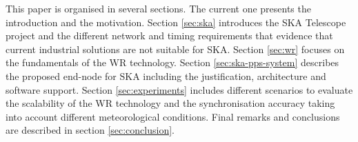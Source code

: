 This paper is organised in several sections. The current one presents the introduction and the motivation. Section \ref{sec:ska} introduces the SKA Telescope project and the different network and timing requirements that evidence that current industrial solutions are not suitable for SKA. Section \ref{sec:wr} focuses on the fundamentals of the WR technology. Section \ref{sec:ska-pps-system} describes the proposed end-node for SKA including the justification, architecture and software support. Section \ref{sec:experiments} includes different scenarios to evaluate the scalability of the WR technology and the synchronisation accuracy taking into account different meteorological conditions. Final remarks and conclusions are described in section \ref{sec:conclusion}. 
